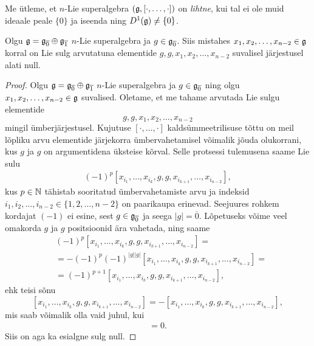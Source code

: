 \begin{dfn}
    Me ütleme, et $n$-Lie superalgebra $(\mathfrak{g}, [\cdot, \dots, \cdot])$
    on \emph{lihtne}, kui tal ei ole muid ideaale peale $\{0\}$
    ja iseenda ning $D^1(\mathfrak{g}) \neq \{0\}$.
\end{dfn}

\begin{lemma}
    Olgu $\mathfrak{g} = \mathfrak{g}_{\overline{0}} \oplus \mathfrak{g}_{\overline{1}}$
    $n$-Lie superalgebra ja $g \in \mathfrak{g}_{\overline{0}}$. Siis
    mistahes $x_1, x_2, \dots, x_{n-2} \in \mathfrak{g}$ korral on
    Lie sulg arvutatuna elementide $g, g, x_1, x_2, \dots, x_{n-2}$
    suvalisel järjestusel alati null.
\end{lemma}

\begin{proof}
    Olgu $\mathfrak{g} = \mathfrak{g}_{\overline{0}} \oplus \mathfrak{g}_{\overline{1}}$
    $n$-Lie superalgebra ja $g \in \mathfrak{g}_{\overline{0}}$ ning olgu
    $x_1, x_2, \dots, x_{n-2} \in \mathfrak{g}$ suvalised. Oletame, et me
    tahame arvutada Lie sulgu elementide
    \[ g, g, x_1, x_2, \dots, x_{n-2} \]
    mingil ümberjärjestusel. Kujutuse $[\cdot, \dots, \cdot]$
    kaldsümmeetrilisuse tõttu on meil lõpliku arvu elementide
    järjekorra ümbervahetamisel võimalik jõuda olukorrani, kus
    $g$ ja $g$ on argumentidena üksteise kõrval. Selle protsessi
    tulemusena saame Lie sulu
    \begin{align*}
        (-1)^p [x_{i_1}, \dots, x_{i_k}, g, g,
            x_{i_{k+1}}, \dots, x_{i_{n-2}}],
    \end{align*}
    kus $p \in \mathbb{N}$ tähistab sooritatud ümbervahetamiste arvu
    ja indeksid $i_1, i_2, \dots, i_{n-2} \in \{1, 2, \dots, n-2\}$ on
    paarikaupa erinevad. Seejuures rohkem kordajat $(-1)$ ei esine,
    sest $g \in \mathfrak{g}_{\overline{0}}$ ja seega $|g| = \overline{0}$.
    Lõpetuseks võime veel omakorda $g$ ja $g$ positsioonid ära
    vahetada, ning saame
    \begin{align*}
        &(-1)^p [x_{i_1}, \dots, x_{i_k}, g, g,
            x_{i_{k+1}}, \dots, x_{i_{n-2}}] = \\
        &= -(-1)^p (-1)^{|g||g|} [x_{i_1}, \dots,
            x_{i_k}, g, g, x_{i_{k+1}}, \dots, x_{i_{n-2}}] = \\
        &= (-1)^{p+1} [x_{i_1}, \dots,
            x_{i_k}, g, g, x_{i_{k+1}}, \dots, x_{i_{n-2}}],
    \end{align*}
    ehk teisi sõnu
    \[
        [x_{i_1}, \dots, x_{i_k}, g, g, x_{i_{k+1}},
        \dots, x_{i_{n-2}}] =
        -[x_{i_1}, \dots, x_{i_k}, g, g, x_{i_{k+1}},
        \dots, x_{i_{n-2}}],
    \]
    mis saab võimalik olla vaid juhul, kui
    \begin{align*}
        [x_{i_1}, \dots, x_{i_k}, g, g, x_{i_{k+1}},
        \dots, x_{i_{n-2}}] = 0.
    \end{align*}
    Siis on aga ka esialgne sulg null.
\end{proof}

